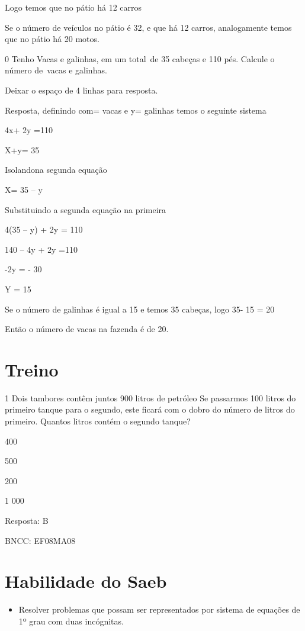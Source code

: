 Logo temos que no pátio há 12 carros

Se o número de veículos no pátio é 32, e que há 12 carros, analogamente
temos que no pátio há 20 motos.

\num{0} Tenho Vacas e galinhas, em um total~de 35 cabeças e 110 pés. Calcule
o número de~vacas e galinhas.

Deixar o espaço de 4 linhas para resposta.

Resposta, definindo com\times = vacas e y= galinhas temos o seguinte sistema

4x+ 2y =110

X+y= 35

Isolando\times na segunda equação

X= 35 -- y

Substituindo a segunda equação na primeira

4(35 -- y) + 2y = 110

140 -- 4y + 2y =110

-2y = - 30

Y = 15

Se o número de galinhas é igual a 15 e temos 35 cabeças, logo 35- 15 =
20

Então o número de vacas na fazenda é de 20.

\section{Treino}

\num{1} Dois tambores contêm juntos 900 litros de petróleo Se passarmos 100
litros do primeiro tanque para o segundo, este ficará com o dobro do
número de litros do primeiro. Quantos litros contém o segundo tanque?

\item 400
\item 500
\item 200
\item 1 000

Resposta: B

BNCC: EF08MA08

\section{Habilidade do Saeb}

\begin{itemize}
\tightlist

\item 
  Resolver problemas que possam ser representados por sistema de
  equações de 1º grau com duas incógnitas.
\end{itemize}

